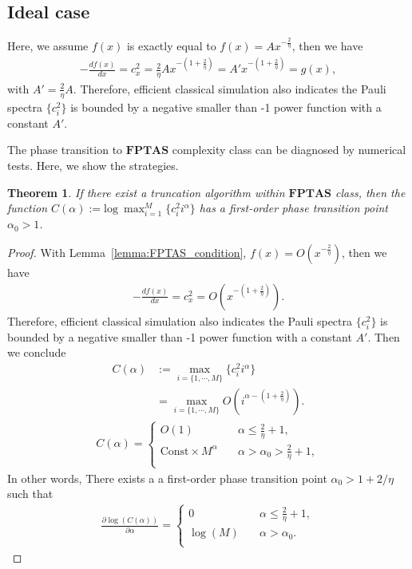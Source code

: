 \documentclass[showpacs,amsmath,amssymb,twocolumn,superscriptaddress,notitlepage,preprintnumbers,aps,pra,10pt,floatfix]{revtex4-2}
\newtheorem{theorem}{Theorem}
\begin{document}
\begin{appendix}
\subsection{Ideal case}
Here, we assume $f(x)$ is exactly equal to $f(x)=Ax^{-\frac{2}{\eta}}$, then we have
\begin{eqnarray}
-\frac{df(x)}{dx}=c_x^2=\frac{2}{\eta}Ax^{-(1+\frac{2}{\eta})}=A'x^{-(1+\frac{2}{\eta})}=g(x),
\end{eqnarray}
with $A'=\frac{2}{\eta}A$. Therefore, efficient classical simulation also indicates the Pauli spectra $\{c_i^2\}$ is bounded by a negative smaller than -1 power function with a constant $A'$.

The phase transition to  $\textbf{FPTAS}$ complexity class can be diagnosed by numerical tests. Here, we show the strategies. 
\begin{theorem}
    If there exist a truncation algorithm within $\textbf{FPTAS}$ class, then the function $C(\alpha):=\text{log}~\max_{i = 1}^{M} \{c_i^2 i^{\alpha}\} $ has a first-order phase transition point $\alpha_0 >1$.  
\end{theorem}
\begin{proof}
    With Lemma~\ref{lemma:FPTAS_condition},  $f(x)=O(x^{-\frac{2}{\eta}})$, then we have
\begin{eqnarray}
-\frac{df(x)}{dx}=c_x^2=O(x^{-(1+\frac{2}{\eta})}).
\end{eqnarray}
Therefore, efficient classical simulation also indicates the Pauli spectra $\{c_i^2\}$ is bounded by a negative smaller than -1 power function with a constant $A'$. Then we conclude
\begin{align}
    C(\alpha)&:=\max_{i = \{1,\cdots,M\}} \{c_i^2 i^{\alpha}\} \\
    &=\max_{i = \{1,\cdots,M\}} O(i^{\alpha-(1+\frac{2}{\eta})}).
\end{align}
\begin{eqnarray}\label{pt1}
C(\alpha)= \begin{cases}
O(1)& \quad \alpha\leq \frac{2}{\eta} +1, \\
\text{Const} \times M^{\alpha}& \quad \alpha>\alpha_0>\frac{2}{\eta}+1,\\
\end{cases}
\end{eqnarray}
In other words, There exists a a first-order phase transition point $\alpha_0 > 1 + 2/\eta$  such that
\begin{eqnarray}
\frac{\partial\log(C(\alpha))}{\partial \alpha}= \begin{cases}
0 & \quad \alpha\leq \frac{2}{\eta}+1, \\
\log(M)& \quad \alpha>\alpha_0.\\
\end{cases}
\end{eqnarray}
\end{proof}



\end{appendix}
\end{document}
